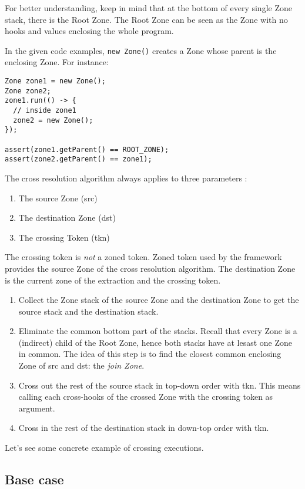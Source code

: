 For better understanding, keep in mind that at the bottom of every single Zone stack, there is the Root Zone. The Root Zone can be seen as the Zone with no hooks and values enclosing the whole program.

In the given code examples, \lstinline{new Zone()} creates a Zone whose parent is the enclosing Zone. For instance:

\begin{lstlisting}
Zone zone1 = new Zone();
Zone zone2;
zone1.run(() -> {
  // inside zone1
  zone2 = new Zone();
});

assert(zone1.getParent() == ROOT_ZONE);
assert(zone2.getParent() == zone1);
\end{lstlisting}

The cross resolution algorithm always applies to three parameters :

\begin{enumerate}
\item The source Zone (src)
\item The destination Zone (dst)
\item The crossing Token (tkn)
\end{enumerate}

The crossing token is \emph{not} a zoned token. Zoned token used by the framework provides the source Zone of the cross resolution algorithm. The destination Zone is the current zone of the extraction and the crossing token.

\begin{enumerate}
\item Collect the Zone stack of the source Zone and the destination Zone to get the source stack and the destination stack.
\item Eliminate the common bottom part of the stacks. Recall that every Zone is a (indirect) child of the Root Zone, hence both stacks have at lesast one Zone in common. The idea of this step is to find the closest common enclosing Zone of src and dst: the \emph{join Zone}.
\item Cross out the rest of the source stack in top-down order with tkn. This means calling each cross-hooks of the crossed Zone with the crossing token as argument.
\item Cross in the rest of the destination stack in down-top order with tkn.
\end{enumerate}

Let's see some concrete example of crossing executions.

\subsection*{Base case}

